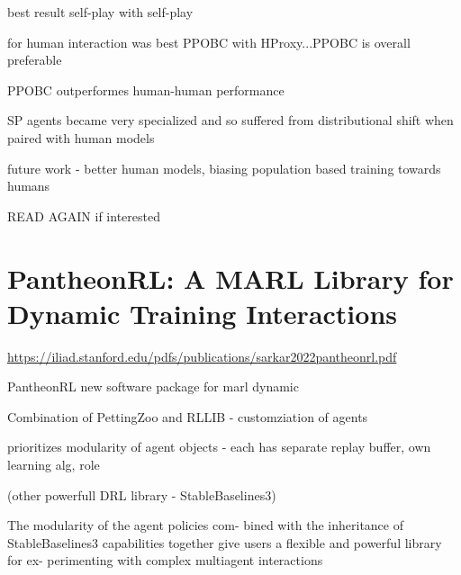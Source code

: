 \documentclass{report}
\begin{document}
\begin{list}{}{}
    \item best result self-play with self-play
    \item for human interaction was best PPOBC with HProxy...PPOBC is overall preferable
    \item PPOBC outperformes human-human performance
    \item SP agents became very specialized and so suffered from distributional shift when paired with human models
    \item future work - better human models, biasing population based training towards humans
    \item READ AGAIN if interested
\end{list}

\section{PantheonRL:
A MARL Library for Dynamic Training Interactions}
\url{https://iliad.stanford.edu/pdfs/publications/sarkar2022pantheonrl.pdf}
\begin{list}{}{}
    \item PantheonRL new software package for marl dynamic
    \item Combination of PettingZoo and RLLIB - customziation of agents
    \item prioritizes modularity of agent objects - each has separate replay buffer, own learning alg, role
    \item (other powerfull DRL library - StableBaselines3)
    \item The modularity of the agent policies com-
    bined with the inheritance of StableBaselines3 capabilities
    together give users a flexible and powerful library for ex-
    perimenting with complex multiagent interactions
    \item 
\end{list}
\end{document}
